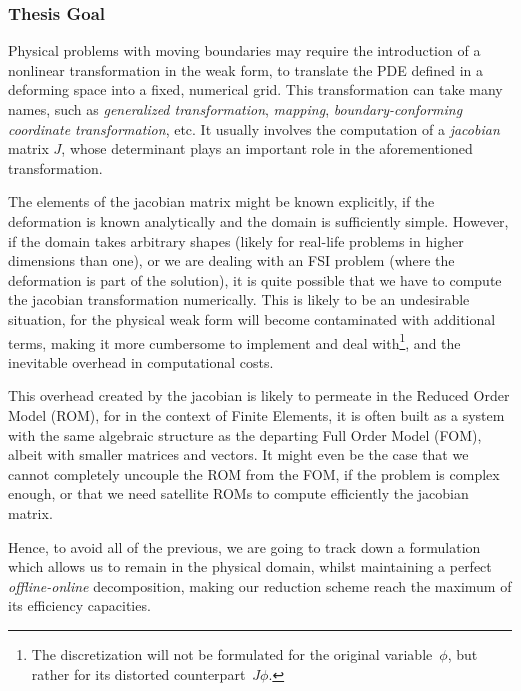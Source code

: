 \documentclass[thesis.tex]{subfiles}
\begin{document}
\subsubsection{Thesis Goal}
Physical problems with moving boundaries may require 
the introduction of a nonlinear transformation in the weak form,
to translate the PDE defined in a deforming space into a fixed, 
numerical grid.
This transformation can take many names, 
such as \textit{generalized transformation}, 
\textit{mapping},
\textit{boundary-conforming coordinate transformation},
etc.
It usually involves the computation of a \textit{jacobian} matrix $J$,
whose determinant plays an important role in the aforementioned transformation.

The elements of the jacobian matrix might be known explicitly,
if the deformation is known analytically and the domain is sufficiently simple.
However, if the domain takes arbitrary shapes 
(likely for real-life problems in higher dimensions than one),
or we are dealing with an FSI problem (where the deformation is part of the solution),
it is quite possible that we have to compute the jacobian transformation numerically.
This is likely to be an undesirable situation, 
for the physical weak form will become contaminated with additional terms, 
making it more cumbersome to implement and deal with\footnote{
    The discretization will not be formulated for the original variable~$\phi$,
    but rather for its distorted counterpart~$J \phi$.
    },
and the inevitable overhead in computational costs.

This overhead created by the jacobian is likely to permeate in the Reduced Order Model (ROM),
for in the context of Finite Elements, it is often built as a system with the same algebraic structure
as the departing Full Order Model (FOM),
albeit with smaller matrices and vectors. 
It might even be the case that we cannot completely uncouple the ROM from the FOM, 
if the problem is complex enough, or that we need satellite ROMs to compute efficiently the jacobian matrix.

Hence, to avoid all of the previous, 
we are going to track down a formulation which allows us to remain in the physical domain, 
whilst maintaining a perfect \textit{offline-online} decomposition,
making our reduction scheme reach the maximum of its efficiency capacities.
\end{document}
